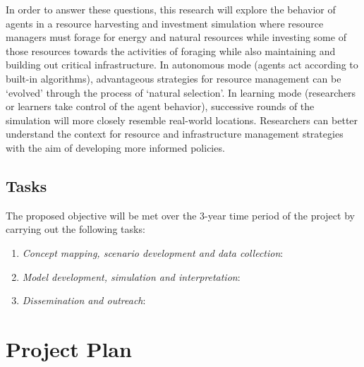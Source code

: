 \documentclass[11pt,a4paper]{article}
\begin{document}
In order to answer these questions,
this research will explore the behavior of agents in 
a resource harvesting and investment simulation where 
resource managers must forage for energy and natural resources 
while investing some of those resources towards the activities of foraging 
while also maintaining and building out critical infrastructure. 
In autonomous mode (agents act according to built-in algorithms), 
advantageous strategies for resource management can be 
`evolved' through the process of `natural selection'. 
In learning mode (researchers or learners take control of the agent behavior), 
successive rounds of the simulation will more closely resemble real-world locations. 
Researchers can better understand the context for 
resource and infrastructure management strategies 
with the aim of developing more informed policies.

\subsection{Tasks}
\label{sec:tasks}

The proposed objective will be met over the 3-year time period of the project by carrying out the following tasks:

\begin{enumerate}[leftmargin=0.75in,label= \emph{Task \arabic*}]
\vspace{-9pt}
\setlength{\itemsep}{-3pt}
	\item	\emph{Concept mapping,  scenario development and data collection}: 		\label{task:concept}
	\item	\emph{Model development, simulation and interpretation}: 		\label{task:development}
	\item	\emph{Dissemination and outreach}: 		\label{task:dissemination}
\end{enumerate}





\section{Project Plan}
\end{document}
